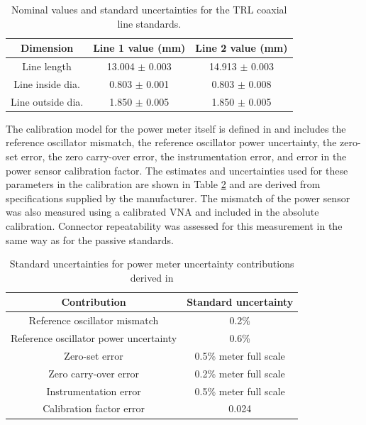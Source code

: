 \documentclass[../thesis/thesis.tex]{subfiles}
\begin{document}
\begin{table}[]
	\centering
	\caption{Nominal values and standard uncertainties for the TRL coaxial line standards.}
	\label{ch5_table_passivestds}
	\begin{tabular}{ccc}
		\hline
		Dimension         & Line 1 value (mm) & Line 2 value (mm) \\ \hline
		Line length       & 13.004 $\pm$ 0.003 & 14.913 $\pm$ 0.003 \\
		Line inside dia.  & 0.803 $\pm$ 0.001 & 0.803 $\pm$ 0.008 \\
		Line outside dia. & 1.850 $\pm$ 0.005 & 1.850 $\pm$ 0.005 \\ \hline            
	\end{tabular}
\end{table}

The calibration model for the power meter itself is defined in \cite{Keysight_2017} and includes the reference oscillator mismatch, the reference oscillator power uncertainty, the zero-set error, the zero carry-over error, the instrumentation error, and error in the power sensor calibration factor. The estimates and uncertainties used for these parameters in the calibration are shown in Table \ref{ch5_table_powerunc} and are derived from specifications supplied by the manufacturer. The mismatch of the power sensor was also measured using a calibrated VNA and included in the absolute calibration. Connector repeatability was assessed for this measurement in the same way as for the passive standards.

\begin{table}[]
	\centering
	\caption{Standard uncertainties for power meter uncertainty contributions derived in \cite{Keysight_2017}}
	\label{ch5_table_powerunc}
	\begin{tabular}{cc}
		\hline
		Contribution                           & Standard uncertainty \\ \hline
		Reference oscillator mismatch          & 0.2\%                \\
		Reference oscillator power uncertainty & 0.6\%                \\
		Zero-set error                         & 0.5\% meter full scale \\
		Zero carry-over error                  & 0.2\% meter full scale \\
		Instrumentation error                  & 0.5\% meter full scale \\
		Calibration factor error               & 0.024               \\ \hline
	\end{tabular}
\end{table}
\end{document}

